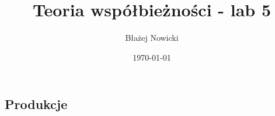 \documentclass[12pt, letterpaper]{article}
\title{Teoria współbieżności - lab 5}
\author{Błażej Nowicki}
\date{\today}
\begin{document}
\maketitle
\subsection*{Produkcje}
\end{document}
